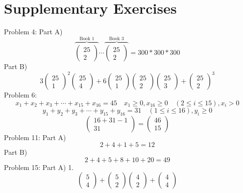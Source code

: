\documentclass{article}
\begin{document}
\section{Supplementary Exercises}
	Problem 4: Part A)
	$$
	\overbrace{\left(\begin{array}{c}
	25\\
	2
	\end{array}\right)}^{\mbox{Book 1}}\cdots\overbrace{\left(\begin{array}{c}
	25\\
	2	
	\end{array}\right)}^{\mbox{Book 3}}=300*300*300
	$$
	Part B)
	$$
	3\left(\begin{array}{c}
	25\\
	1
	\end{array}\right)^2
	\left(\begin{array}{c}
	25\\
	4
	\end{array}\right)
	+
	6\left(\begin{array}{c}
	25\\
	1
	\end{array}\right)
	\left(\begin{array}{c}
	25\\
	2
	\end{array}\right)
	\left(\begin{array}{c}
	25\\
	3	
	\end{array}\right)
	+
	\left(\begin{array}{c}
	25\\
	2
	\end{array}\right)^3
	$$
	Problem 6:
	$$
	x_1+x_2+x_3+\cdots+x_{15}+x_{16}=45 \quad x_1\geq{0},x_{16}\geq{0} \quad (2\leq{i}\leq{15}),x_i>0
	$$
	$$
	y_1+y_2+y_3+\cdots+y_{15}+y_{16}=31 \quad (1\leq{i}\leq{16}),y_i\geq{0}	
	$$
	$$
	\left(\begin{array}{c}
	16+31-1\\
	31
	\end{array}\right)
	=
	\left(\begin{array}{c}
	46\\
	15
	\end{array}\right)
	$$
	Problem 11: Part A)
	$$
	2+4+1+5=12
	$$
	Part B)
	$$
	2+4+5+8+10+20=49
	$$
	Problem 15: Part A) 1.	
	$$
	\left(\begin{array}{c}
	5\\
	4
	\end{array}\right)
	+
	\left(\begin{array}{c}
	5\\
	2
	\end{array}\right)
	\left(\begin{array}{c}
	4\\
	2
	\end{array}\right)
	+
	\left(\begin{array}{c}
	4\\
	4
	\end{array}\right)
	$$
\end{document}
